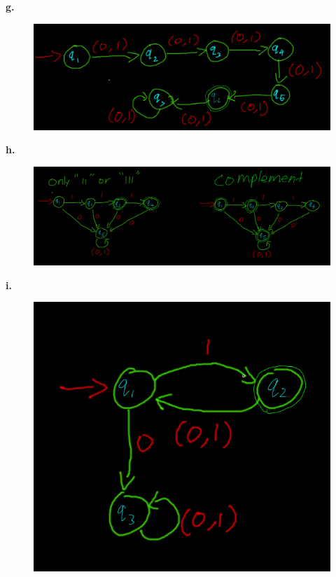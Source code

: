 \documentclass[letter]{article}
\theoremstyle{case}
\begin{document}
\textbf{g.}
\begin{figure}[h!]
	\includegraphics[scale=0.4]{6g.png}
\end{figure}

\textbf{h.}
\begin{figure}[h!]
	\includegraphics[scale=0.4]{6h.png}
\end{figure}
\newpage
\textbf{i.}
\begin{figure}[h!]
	\includegraphics[scale=0.4]{6i.png}
\end{figure}
\end{document}
